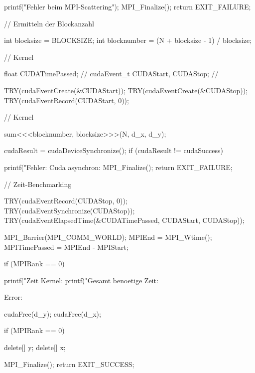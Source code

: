 \documentclass[doktyp=semarbeit, sprache=german]{TUBAFarbeiten}
\begin{document}
\begin{appendix}
\begin{CPP}
{{   		printf("Fehler beim MPI-Scattering");
    		MPI_Finalize();
    		return EXIT_FAILURE;
  	}

	// Ermitteln der Blockanzahl	

  	int blocksize = BLOCKSIZE;
  	int blocknumber = (N + blocksize - 1) / blocksize;

	// Kernel

	float CUDATimePassed; // 
	cudaEvent_t CUDAStart, CUDAStop; // 
	
	TRY(cudaEventCreate(&CUDAStart));
	TRY(cudaEventCreate(&CUDAStop));
	TRY(cudaEventRecord(CUDAStart, 0));

	// Kernel

	sum<<<blocknumber, blocksize>>>(N, d_x, d_y);

  	cudaResult = cudaDeviceSynchronize();
  	if (cudaResult != cudaSuccess) {
	
        	printf("Fehler: Cuda asynchron: 
    		MPI_Finalize();
    		return EXIT_FAILURE;
  	}

	// Zeit-Benchmarking

	TRY(cudaEventRecord(CUDAStop, 0));
	TRY(cudaEventSynchronize(CUDAStop));
	TRY(cudaEventElapsedTime(&CUDATimePassed, CUDAStart, CUDAStop));

	MPI_Barrier(MPI_COMM_WORLD);
	MPIEnd = MPI_Wtime();
	MPITimePassed = MPIEnd - MPIStart;

	if (MPIRank == 0) {

		printf("\nBenoetigte Zeit Kernel: %
		printf("Gesamt benoetige Zeit: %
	}

	

Error:

  	cudaFree(d_y);
  	cudaFree(d_x);

  	if (MPIRank == 0) {

    		delete[] y;
    		delete[] x;
  	}

  	MPI_Finalize();
  	return EXIT_SUCCESS;
}
\end{CPP}
\end{appendix}
\newpage
{}
\end{document}
